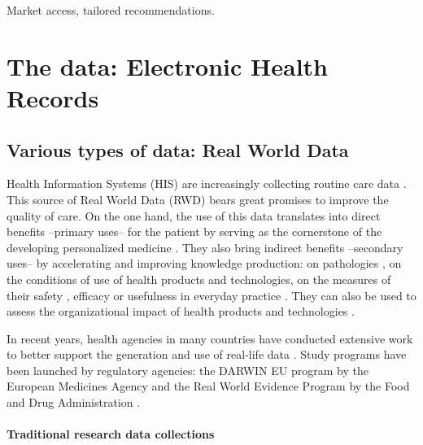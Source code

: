 \documentclass[french,12pt,twoside,a4paper]{book}
\begin{document}
Market access, tailored recommendations.

\section{The data: Electronic Health Records}\label{sec:intro:data}

\subsection{Various types of data: Real World Data}\label{subsec:intro:real_world_data}


Health Information Systems (HIS) are increasingly collecting routine care data
\citep{jha_use_2009,sheikh_adoption_2014,kim_rate_2017,esdar_diffusion_2019,kanakubo_comparing_2019,liang_adoption_2021,apathy_decade_2021}.
This source of Real World Data (RWD) \citep{fda_real-world_2021} bears great
promises to improve the quality of care. On the one hand, the use of this data
translates into direct benefits --primary uses-- for the patient by serving as
the cornerstone of the developing personalized medicine
\citep{mann_artificial_2022,ziegler_high_2022}. They also bring
indirect benefits --secondary uses-- by accelerating and improving knowledge
production: on pathologies \citep{campbell_characterizing_2022}, on the conditions of use of health products and
technologies\citep{safran_toward_2007,tuppin_value_2017}, on the measures of
their safety \citep{wisniewski_development_2003}, efficacy or usefulness in
everyday practice \citep{richesson_electronic_2013}. They can also be used to
assess the organizational impact of health products and technologies
\citep{has_guide_2020,has_real-world_2021}.

In recent years, health agencies in many countries have conducted extensive work
to better support the generation and use of real-life data
\citep{has_real-world_2021,kent_nice_2022,plamondongenevieve_integration_2022,fda_real-world_2021}.
Study programs have been launched by regulatory agencies: the DARWIN EU
program by the European Medicines Agency and the Real World Evidence Program by
the Food and Drug Administration \citep{fda_real_2018}.


\paragraph{Traditional research data collections}
\end{document}
